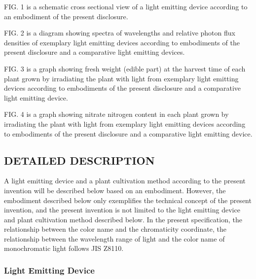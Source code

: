 \documentclass[11pt,a4paper]{article}
\begin{document}
FIG. 1 is a schematic cross sectional view of a light emitting device according to an embodiment of the present disclosure.

FIG. 2 is a diagram showing spectra of wavelengths and relative photon flux densities of exemplary light emitting devices according to embodiments of the present disclosure and a comparative light emitting devices.

FIG. 3 is a graph showing fresh weight (edible part) at the harvest time of each plant grown by irradiating the plant with light from exemplary light emitting devices according to embodiments of the present disclosure and a comparative light emitting device.

FIG. 4 is a graph showing nitrate nitrogen content in each plant grown by irradiating the plant with light from exemplary light emitting devices according to embodiments of the present disclosure and a comparative light emitting device.

\subsection{DETAILED DESCRIPTION}

A light emitting device and a plant cultivation method according to the present invention will be described below based on an embodiment. However, the embodiment described below only exemplifies the technical concept of the present invention, and the present invention is not limited to the light emitting device and plant cultivation method described below. In the present specification, the relationship between the color name and the chromaticity coordinate, the relationship between the wavelength range of light and the color name of monochromatic light follows JIS Z8110.

\subsubsection{Light Emitting Device}
\end{document}

